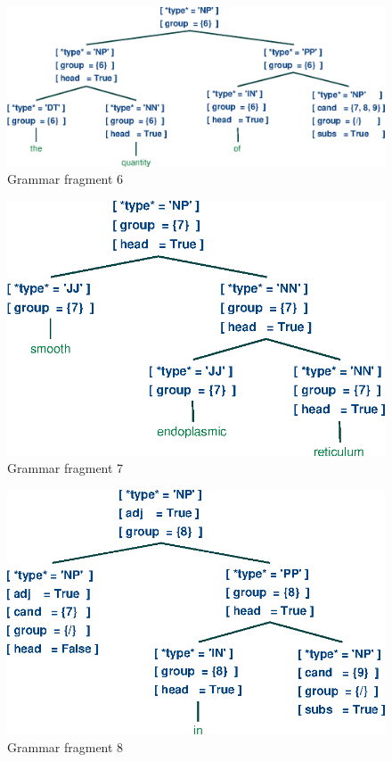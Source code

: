 \documentclass[a4paper]{article}
\begin{document}
\begin{figure}[h]
    \begin{center}
        \includegraphics[scale=0.5]{6.eps}
    \end{center}
    \caption{Grammar fragment 6}
\end{figure}
\begin{figure}[h]
    \begin{center}
        \includegraphics[scale=0.5]{7.eps}
    \end{center}
    \caption{Grammar fragment 7}
\end{figure}
\begin{figure}[h]
    \begin{center}
        \includegraphics[scale=0.5]{8.eps}
    \end{center}
    \caption{Grammar fragment 8}
\end{figure}
\end{document}
